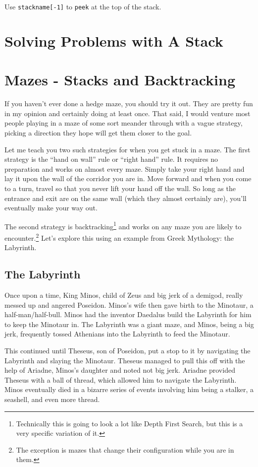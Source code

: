 Use \texttt{stackname[-1]} to \texttt{peek} at the top of the stack.




\section{Solving Problems with A Stack}


\section{Mazes - Stacks and Backtracking}

If you haven't ever done a hedge maze, you should try it out.  They are pretty fun in my opinion and certainly doing at least once.  That said, I would venture most people playing in a maze of some sort meander through with a vague strategy, picking a direction they hope will get them closer to the goal.

Let me teach you two such strategies for when you get stuck in a maze.  The first strategy is the ``hand on wall'' rule or ``right hand'' rule.  It requires no preparation and works on almost every maze.  Simply take your right hand and lay it upon the wall of the corridor you are in.  Move forward and when you come to a turn, travel so that you never lift your hand off the wall.  So long as the entrance and exit are on the same wall (which they almost certainly are), you'll eventually make your way out.

The second strategy is backtracking\footnote{Technically this is going to look a lot like Depth First Search, but this is a very specific variation of it.} and works on any maze you are likely to encounter.\footnote{The exception is mazes that change their configuration while you are in them.}  Let's explore this using an example from Greek Mythology: the Labyrinth. 

\subsection{The Labyrinth}
Once upon a time, King Minos, child of Zeus and big jerk of a demigod, really messed up and angered Poseidon.  Minos's wife then gave birth to the Minotaur, a half-man/half-bull.  Minos had the inventor Daedalus build the Labyrinth for him to keep the Minotaur in.  The Labyrinth was a giant maze, and Minos, being a big jerk, frequently tossed Athenians into the Labyrinth to feed the Minotaur.  

This continued until Theseus, son of Poseidon, put a stop to it by navigating the Labyrinth and slaying the Minotaur. Theseus managed to pull this off with the help of Ariadne, Minos's daughter and noted not big jerk. Ariadne provided Theseus with a ball of thread, which allowed him to navigate the Labyrinth. Minos eventually died in a bizarre series of events involving him being a stalker, a seashell, and even more thread.

